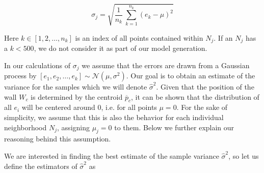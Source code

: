 {\setlength\abovedisplayshortskip{-2pt} \setlength\belowdisplayshortskip{2pt} %
\begin{equation}
\sigma_j = \sqrt{ \frac{1}{n_k}\ \sum_{k=1}^{n_k} (e_k-\mu)^2 } 
\label{eq:std}
\end{equation} 
}

\noindent Here $k \in [1,2,\dots,n_k]$ is an index of all points contained within $N_j$. If an $N_j$ has a $k<500$, we do not consider it as part of our model generation. 


In our calculations of $\sigma_j$ we assume that the errors are drawn from a
Gaussian process by $[e_1,e_2,\dots,e_k ] \sim \mathcal{N}(\mu,\sigma^2)$. Our
goal is to obtain an estimate of the variance for the samples which we will
denote $\hat{\sigma}^2$. Given that the position of the wall $W_c$ is
determined by the centroid $\overline{p}_c$, it can be shown that the distribution
of all $e_i$ will be centered around 0, i.e. for all points $\mu=0$. For the
sake of simplicity, we assume that this is also the behavior for each
individual neighborhood $N_j$, assigning $\mu_j=0$ to them. Below we further
explain our reasoning behind this assumption. 

We are interested in finding the best estimate of the sample variance $\hat{\sigma}^2$, so let us define the estimators of $\hat{\sigma}^2$ as


